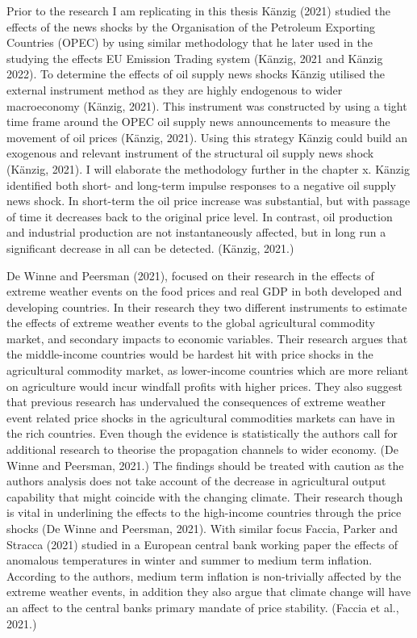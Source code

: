\documentclass[
]{article}
\begin{document}
Prior to the research I am replicating in this thesis Känzig (2021) studied the effects of the news shocks by the Organisation of the Petroleum Exporting Countries (OPEC) by using similar methodology that he later used in the studying the effects EU Emission Trading system (Känzig, 2021 and Känzig 2022). To determine the effects of oil supply news shocks Känzig utilised the external instrument method as they are highly endogenous to wider macroeconomy (Känzig, 2021). This instrument was constructed by using a tight time frame around the OPEC oil supply news announcements to measure the movement of oil prices (Känzig, 2021). Using this strategy Känzig could build an exogenous and relevant instrument of the structural oil supply news shock (Känzig, 2021). I will elaborate the methodology further in the chapter x. Känzig identified both short- and long-term impulse responses to a negative oil supply news shock. In short-term the oil price increase was substantial, but with passage of time it decreases back to the original price level. In contrast, oil production and industrial production are not instantaneously affected, but in long run a significant decrease in all can be detected. (Känzig, 2021.)

De Winne and Peersman (2021), focused on their research in the effects of extreme weather events on the food prices and real GDP in both developed and developing countries. In their research they two different instruments to estimate the effects of extreme weather events to the global agricultural commodity market, and secondary impacts to economic variables. Their research argues that the middle-income countries would be hardest hit with price shocks in the agricultural commodity market, as lower-income countries which are more reliant on agriculture would incur windfall profits with higher prices. They also suggest that previous research has undervalued the consequences of extreme weather event related price shocks in the agricultural commodities markets can have in the rich countries. Even though the evidence is statistically the authors call for additional research to theorise the propagation channels to wider economy. (De Winne and Peersman, 2021.) The findings should be treated with caution as the authors analysis does not take account of the decrease in agricultural output capability that might coincide with the changing climate. Their research though is vital in underlining the effects to the high-income countries through the price shocks (De Winne and Peersman, 2021). With similar focus Faccia, Parker and Stracca (2021) studied in a European central bank working paper the effects of anomalous temperatures in winter and summer to medium term inflation. According to the authors, medium term inflation is non-trivially affected by the extreme weather events, in addition they also argue that climate change will have an affect to the central banks primary mandate of price stability. (Faccia et al., 2021.)
\end{document}
